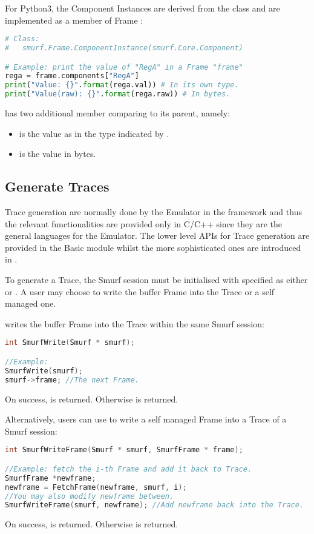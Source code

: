 For Python3, the Component Instances are derived from the class  and are implemented as a member of Frame :
\begin{lstlisting}[language=Python,caption={smurf.Trace\label{api:Core.TraceP}}]
# Class:
#	smurf.Frame.ComponentInstance(smurf.Core.Component)

# Example: print the value of "RegA" in a Frame "frame"
rega = frame.components["RegA"]
print("Value: {}".format(rega.val)) # In its own type.
print("Value(raw): {}".format(rega.raw)) # In bytes.
\end{lstlisting}
 has two additional member comparing to its parent, namely:
\begin{itemize}
	\item {} is the value as in the type indicated by .
	\item {} is the value in bytes. 
\end{itemize}


\subsection{Generate Traces}
Trace generation are normally done by the Emulator in the \smurf framework and thus the relevant functionalities are provided only in C/C++ since they are the general languages for the Emulator. The lower level APIs for Trace generation are provided in the Basic module whilst the more sophisticated ones are introduced in .

To generate a Trace, the Smurf session must be initialised with  specified as either  or . A user may choose to write the buffer Frame into the Trace or a self managed one.

 writes the buffer Frame into the Trace within the same Smurf session:
\begin{lstlisting}[language=C++, caption={SmurfWrite()\label{api:SmurfWriteC}}]
int SmurfWrite(Smurf * smurf);

//Example:
SmurfWrite(smurf);
smurf->frame; //The next Frame.
\end{lstlisting}
On success,  is returned. Otherwise  is returned.

Alternatively, users can use  to write a self managed Frame into a Trace of a Smurf session:
\begin{lstlisting}[language=C++, caption={SmurfWriteFrame()\label{api:SmurfWriteFrameC}}]
int SmurfWriteFrame(Smurf * smurf, SmurfFrame * frame);

//Example: fetch the i-th Frame and add it back to Trace.
SmurfFrame *newframe;
newframe = FetchFrame(newframe, smurf, i);
//You may also modify newframe between.
SmurfWriteFrame(smurf, newframe); //Add newframe back into the Trace.
\end{lstlisting}
On success,  is returned. Otherwise  is returned.

